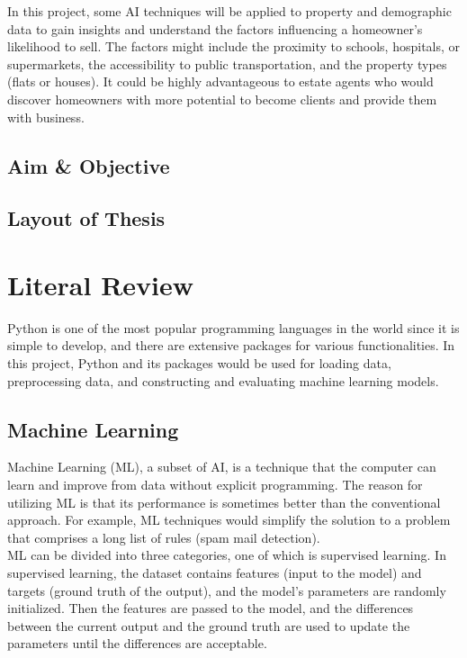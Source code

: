 \documentclass[12pt,twoside]{report}
\begin{document}
In this project, some AI techniques will be applied to property and demographic data to gain insights and understand the factors influencing a homeowner's likelihood to sell. The factors might include the proximity to schools, hospitals, or supermarkets, the accessibility to public transportation, and the property types (flats or houses). It could be highly advantageous to estate agents who would discover homeowners with more potential to become clients and provide them with business. 

\section{Aim \& Objective}
\section{Layout of Thesis}

\chapter{Literal Review}
Python is one of the most popular programming languages in the world since it is simple to develop, and there are extensive packages for various functionalities. In this project, Python and its packages would be used for loading data, preprocessing data, and constructing and evaluating machine learning models. 

\section{Machine Learning}
Machine Learning (ML), a subset of AI, is a technique that the computer can learn and improve from data without explicit programming. The reason for utilizing ML is that its performance is sometimes better than the conventional approach. For example, ML techniques would simplify the solution to a problem that comprises a long list of rules (spam mail detection). 
\\

ML can be divided into three categories, one of which is supervised learning. In supervised learning, the dataset contains features (input to the model) and targets (ground truth of the output), and the model's parameters are randomly initialized. Then the features are passed to the model, and the differences between the current output and the ground truth are used to update the parameters until the differences are acceptable. 
\\
\end{document}
